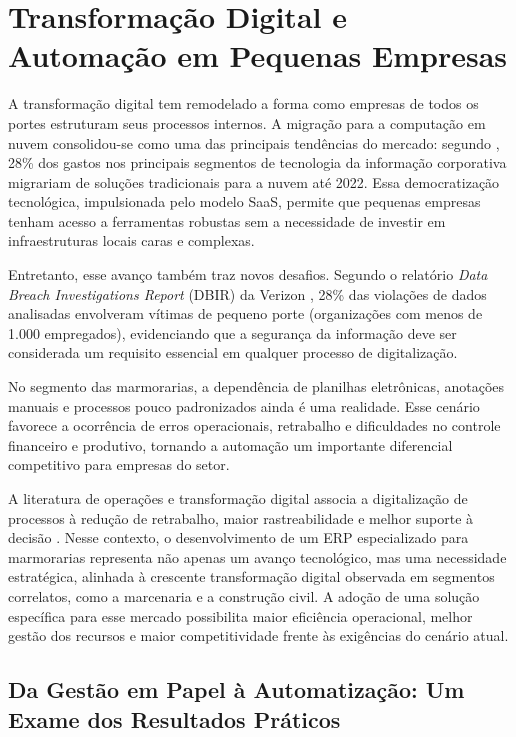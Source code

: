 \section{Transformação Digital e Automação em Pequenas Empresas}
A transformação digital tem remodelado a forma como empresas de todos os portes estruturam seus processos internos. A migração para a computação em nuvem consolidou-se como uma das principais tendências do mercado: segundo , 28\% dos gastos nos principais segmentos de tecnologia da informação corporativa migrariam de soluções tradicionais para a nuvem até 2022. Essa democratização tecnológica, impulsionada pelo modelo SaaS, permite que pequenas empresas tenham acesso a ferramentas robustas sem a necessidade de investir em infraestruturas locais caras e complexas.

Entretanto, esse avanço também traz novos desafios. Segundo o relatório \textit{Data Breach Investigations Report} (DBIR) da Verizon \cite{verizon2020dbir}, 28\% das violações de dados analisadas envolveram vítimas de pequeno porte (organizações com menos de 1.000 empregados), evidenciando que a segurança da informação deve ser considerada um requisito essencial em qualquer processo de digitalização.

No segmento das marmorarias, a dependência de planilhas eletrônicas, anotações manuais e processos pouco padronizados ainda é uma realidade. Esse cenário favorece a ocorrência de erros operacionais, retrabalho e dificuldades no controle financeiro e produtivo, tornando a automação um importante diferencial competitivo para empresas do setor.

A literatura de operações e transformação digital associa a digitalização de processos à redução de retrabalho, maior rastreabilidade e melhor suporte à decisão \cite{davenport1998, slack2008}. Nesse contexto, o desenvolvimento de um ERP especializado para marmorarias representa não apenas um avanço tecnológico, mas uma necessidade estratégica, alinhada à crescente transformação digital observada em segmentos correlatos, como a marcenaria e a construção civil. A adoção de uma solução específica para esse mercado possibilita maior eficiência operacional, melhor gestão dos recursos e maior competitividade frente às exigências do cenário atual.

\subsection{Da Gestão em Papel à Automatização: Um Exame dos Resultados Práticos}

